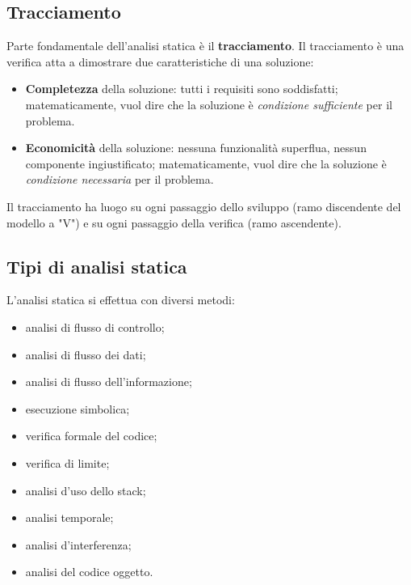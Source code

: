 \documentclass[a4paper]{article}
\begin{document}
		
	\subsection{Tracciamento}

		
Parte fondamentale dell'analisi statica è il \textbf{tracciamento}. Il tracciamento è una verifica atta a dimostrare due caratteristiche di una soluzione:
		
	\begin{itemize}
		
			
	\item \textbf{Completezza} della soluzione: tutti i requisiti sono soddisfatti; matematicamente, vuol dire che la soluzione è \emph{condizione sufficiente} per il problema.
			
	\item \textbf{Economicità} della soluzione: nessuna funzionalità superflua, nessun componente ingiustificato; matematicamente, vuol dire che la soluzione è \emph{condizione necessaria} per il problema.
		
	\end{itemize}

		
Il tracciamento ha luogo su ogni passaggio dello sviluppo (ramo discendente del modello a "V") e su ogni passaggio della verifica (ramo ascendente).

		
	\subsection{Tipi di analisi statica}

		
L'analisi statica si effettua con diversi metodi:
		
	\begin{itemize}
		
			
	\item analisi di flusso di controllo;
			
	\item analisi di flusso dei dati;
			
	\item analisi di flusso dell'informazione;
			
	\item esecuzione simbolica;
			
	\item verifica formale del codice;
			
	\item verifica di limite;
			
	\item analisi d'uso dello stack;
			
	\item analisi temporale;
			
	\item analisi d'interferenza;
			
	\item analisi del codice oggetto.
		
	\end{itemize}
\end{document}
